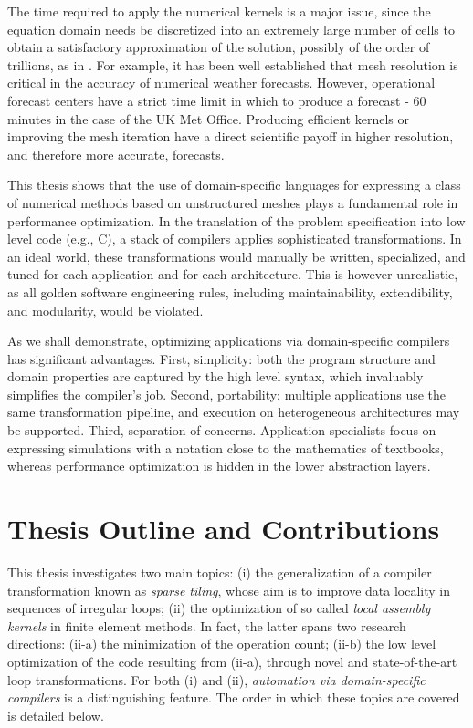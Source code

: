 The time required to apply the numerical kernels is a major issue, since the equation domain needs be discretized into an extremely large number of cells to obtain a satisfactory approximation of the solution, possibly of the order of trillions, as in \cite{Rossinelli2013}. For example, it has been well established that mesh resolution is critical in the accuracy of numerical weather forecasts. However, operational forecast centers have a strict time limit in which to produce a forecast - 60 minutes in the case of the UK Met Office. Producing efficient kernels or improving the mesh iteration have a direct scientific payoff in higher resolution, and therefore more accurate, forecasts. 

This thesis shows that the use of domain-specific languages for expressing a class of numerical methods based on unstructured meshes plays a fundamental role in performance optimization. In the translation of the problem specification into low level code (e.g., C), a stack of compilers applies sophisticated transformations. In an ideal world, these transformations would manually be written, specialized, and tuned for each application and for each architecture. This is however unrealistic, as all golden software engineering rules, including maintainability, extendibility, and modularity, would be violated.

As we shall demonstrate, optimizing applications via domain-specific compilers has significant advantages. First, simplicity: both the program structure and domain properties are captured by the high level syntax, which invaluably simplifies the compiler's job. Second, portability: multiple applications use the same transformation pipeline, and execution on heterogeneous architectures may be supported. Third, separation of concerns. Application specialists focus on expressing simulations with a notation close to the mathematics of textbooks, whereas performance optimization is hidden in the lower abstraction layers. 

\section{Thesis Outline and Contributions}
\label{sec:contributions}
This thesis investigates two main topics: (i) the generalization of a compiler transformation known as {\em sparse tiling}, whose aim is to improve data locality in sequences of irregular loops; (ii) the optimization of so called {\em local assembly kernels} in finite element methods. In fact, the latter spans two research directions: (ii-a) the minimization of the operation count; (ii-b) the low level optimization of the code resulting from (ii-a), through novel and state-of-the-art loop transformations. For both (i) and (ii), {\it automation via domain-specific compilers} is a distinguishing feature. The order in which these topics are covered is detailed below.

